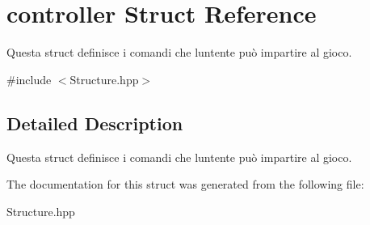 \hypertarget{structcontroller}{}\section{controller Struct Reference}
\label{structcontroller}


Questa struct definisce i comandi che l\textquotesingle{}untente può impartire al gioco.  




{\ttfamily \#include $<$Structure.\+hpp$>$}



\subsection{Detailed Description}
Questa struct definisce i comandi che l\textquotesingle{}untente può impartire al gioco. 

The documentation for this struct was generated from the following file\+:\begin{DoxyCompactItemize}
\item 
Structure.\+hpp\end{DoxyCompactItemize}
